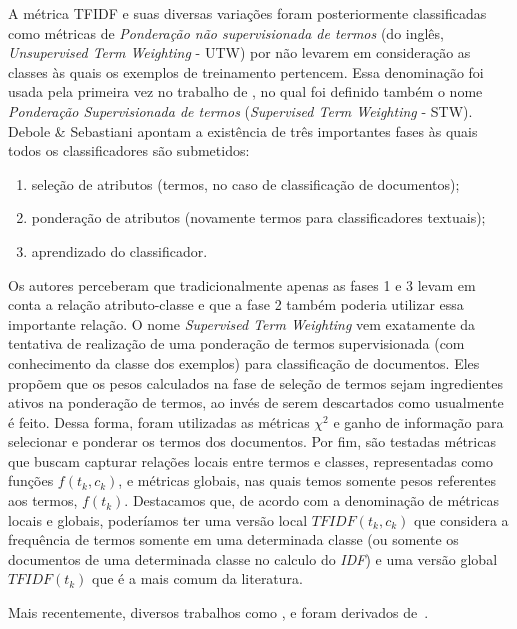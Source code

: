 A métrica \textsc{TFIDF} e suas diversas variações foram posteriormente classificadas como métricas de \textit{Ponderação não supervisionada de termos} (do inglês, \textit{Unsupervised Term Weighting} - \textsc{UTW}) por não levarem em consideração as classes às quais os exemplos de treinamento pertencem. Essa denominação foi usada pela primeira vez no trabalho de \cite{Debole03}, no qual foi definido também o nome \textit{Ponderação Supervisionada de termos} (\textit{Supervised Term Weighting} - \textsc{STW}). 
Debole \& Sebastiani apontam a existência de três importantes fases às quais todos os classificadores são submetidos: 
\begin{enumerate}
\item seleção de atributos (termos, no caso de classificação de documentos);
\item ponderação de atributos (novamente termos para classificadores textuais);
\item aprendizado do classificador.
\end{enumerate}
Os autores perceberam que tradicionalmente apenas as fases 1 e 3 levam em conta a relação atributo-classe e que a fase 2 também poderia utilizar essa importante relação.
O nome \textit{Supervised Term Weighting} vem exatamente da tentativa de realização de uma ponderação de termos supervisionada (com conhecimento da classe dos exemplos) para classificação de documentos. Eles propõem que os pesos calculados na fase de seleção de termos sejam ingredientes ativos na ponderação de termos, ao invés de serem descartados como usualmente é feito. 
Dessa forma, foram utilizadas as métricas $\chi^2$ e ganho de informação para selecionar e ponderar os termos dos documentos.
Por fim, são testadas métricas que buscam capturar relações locais entre termos e classes, representadas como funções $f(t_k, c_k)$, e métricas globais, nas quais temos somente pesos referentes aos termos, $f(t_k)$. Destacamos que, de acordo com a denominação de métricas locais e globais, poderíamos ter uma versão local \textit{$TFIDF(t_k, c_k)$} que considera a frequência de termos somente em uma determinada classe (ou somente os documentos de uma determinada classe no calculo do \textit{IDF}) e uma versão global \textit{$TFIDF(t_k)$} que é a mais comum da literatura.

Mais recentemente, diversos trabalhos como \cite{Lan05}, \cite{Batal09} e \cite{Liu09} foram derivados de~\cite{Debole03}.

